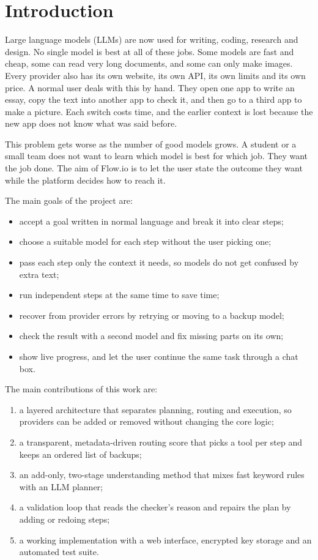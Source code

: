 \documentclass[conference]{IEEEtran}
\begin{document}
\section{Introduction}
Large language models (LLMs) are now used for writing, coding, research and design. No single model is
best at all of these jobs. Some models are fast and cheap, some can read very long documents, and some
can only make images. Every provider also has its own website, its own API, its own limits and its own
price. A normal user deals with this by hand. They open one app to write an essay, copy the text into
another app to check it, and then go to a third app to make a picture. Each switch costs time, and the
earlier context is lost because the new app does not know what was said before.

This problem gets worse as the number of good models grows. A student or a small team does not want to
learn which model is best for which job. They want the job done. The aim of Flow.io is to let the user
state the outcome they want while the platform decides how to reach it.

The main goals of the project are:
\begin{itemize}
\item accept a goal written in normal language and break it into clear steps;
\item choose a suitable model for each step without the user picking one;
\item pass each step only the context it needs, so models do not get confused by extra text;
\item run independent steps at the same time to save time;
\item recover from provider errors by retrying or moving to a backup model;
\item check the result with a second model and fix missing parts on its own;
\item show live progress, and let the user continue the same task through a chat box.
\end{itemize}

The main contributions of this work are:
\begin{enumerate}
\item a layered architecture that separates planning, routing and execution, so providers can be added
or removed without changing the core logic;
\item a transparent, metadata-driven routing score that picks a tool per step and keeps an ordered list
of backups;
\item an add-only, two-stage understanding method that mixes fast keyword rules with an LLM planner;
\item a validation loop that reads the checker's reason and repairs the plan by adding or redoing steps;
\item a working implementation with a web interface, encrypted key storage and an automated test suite.
\end{enumerate}
\end{document}
